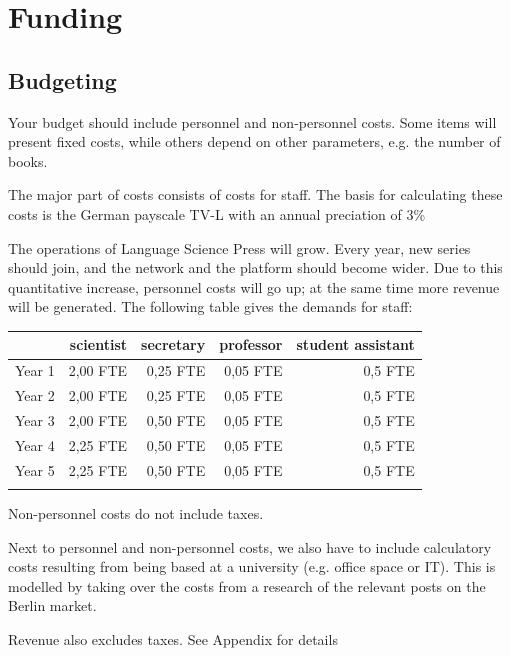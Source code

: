 \documentclass[output=guidelines,nonflat,smallfont,
draftmode
]{langsci/langscibook}
\newcommand{\background}[1]{ 
  \vspace{5mm}
  \renewcommand{\tblslinecolour}{lsDarkBlue}
  \tblssy[red]{explore2}{Background}{\vspace*{-5mm}#1}
}
\newcommand{\langscisolution}[1]{
  \renewcommand{\tblslinecolour}{lsLightBlue}
  \tblssy{langsci}{LangSci solution}{\vspace*{-5mm}#1}
}
\renewcommand{\tblssy}[4][black!12]{%
  \renewcommand{\langscisymbol}{#2}\renewcommand{\tblsboxcolor}{#1}
  \begin{mdframed}[style=yellowexercise,frametitle={#3}]
    #4
  \end{mdframed}
}
\begin{document}
\chapter{Funding}

\section{Budgeting}

\background{Your budget should include personnel and non-personnel costs. Some items will present fixed costs, while others depend on other parameters, e.g. the number of books.}
\langscisolution{
The major part of costs consists of costs for staff. The basis for calculating these costs is the German payscale TV-L with an annual preciation of 3\%

The operations of Language Science Press will grow. Every year, new series should join, and the network and the platform should become wider. Due to this quantitative increase, personnel costs will go up; at the same time more revenue will be generated. The following table gives the demands for staff:%

\noindent
\begin{tabularx}{\textwidth}{Xrrrr}
\lsptoprule
         &  scientist  & secretary &   professor &   student assistant  \\
\midrule
Year 1 &  2,00 FTE                 &    0,25 FTE                       &   0,05 FTE    &   0,5 FTE                  \\
Year 2 &  2,00 FTE                 &    0,25 FTE                       &   0,05 FTE    &   0,5 FTE                  \\
Year 3 &  2,00 FTE                 &    0,50 FTE                        &   0,05 FTE    &   0,5 FTE                  \\
Year 4 &  2,25 FTE              &    0,50 FTE                        &   0,05 FTE    &   0,5 FTE                  \\
Year 5 &  2,25 FTE              &    0,50 FTE                        &   0,05 FTE    &   0,5 FTE                  \\
\lspbottomrule
\end{tabularx}

Non-personnel costs do not include taxes. 

Next to personnel and non-personnel costs, we also have to include calculatory costs resulting from being based at a university (e.g. office space or IT). This is modelled by taking over the costs from a research of the relevant posts on the Berlin market. 

Revenue also excludes taxes. See Appendix for details
}
\end{document}
